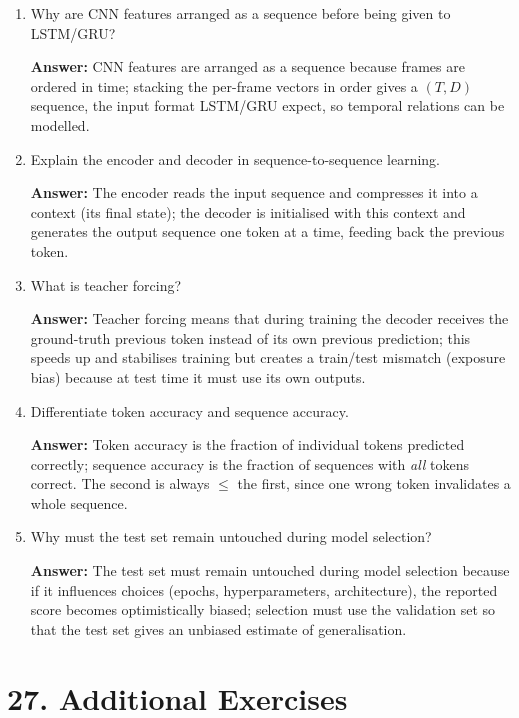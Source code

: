 \documentclass[10pt]{article}
\begin{document}
\begin{enumerate}
\textbf{Answer:} The recurrent network learns temporal information across
frames: how the spatial features change (motion, repetition, order of
events), which decides the action.

\item Why are CNN features arranged as a sequence before being given to LSTM/GRU?

\textbf{Answer:} CNN features are arranged as a sequence because frames are
ordered in time; stacking the per-frame vectors in order gives a $(T,D)$
sequence, the input format LSTM/GRU expect, so temporal relations can be
modelled.

\item Explain the encoder and decoder in sequence-to-sequence learning.

\textbf{Answer:} The encoder reads the input sequence and compresses it
into a context (its final state); the decoder is initialised with this
context and generates the output sequence one token at a time, feeding back
the previous token.

\item What is teacher forcing?

\textbf{Answer:} Teacher forcing means that during training the decoder
receives the ground-truth previous token instead of its own previous
prediction; this speeds up and stabilises training but creates a
train/test mismatch (exposure bias) because at test time it must use its
own outputs.

\item Differentiate token accuracy and sequence accuracy.

\textbf{Answer:} Token accuracy is the fraction of individual tokens
predicted correctly; sequence accuracy is the fraction of sequences with
\emph{all} tokens correct. The second is always $\le$ the first, since one
wrong token invalidates a whole sequence.

\item Why must the test set remain untouched during model selection?

\textbf{Answer:} The test set must remain untouched during model selection
because if it influences choices (epochs, hyperparameters, architecture),
the reported score becomes optimistically biased; selection must use the
validation set so that the test set gives an unbiased estimate of
generalisation.
\end{enumerate}

\section*{27. Additional Exercises}
\end{document}

